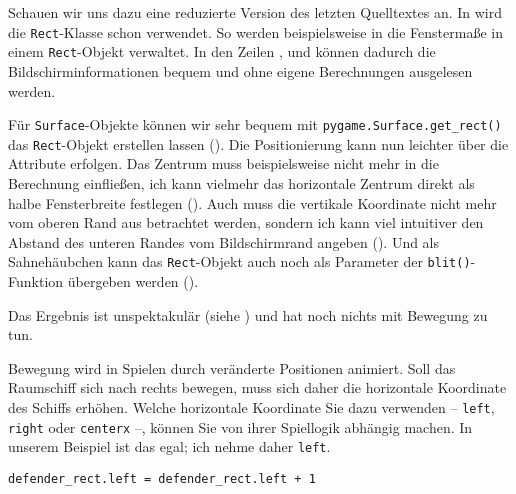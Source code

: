 Schauen wir uns dazu eine reduzierte Version des letzten Quelltextes an. In  wird die \texttt{Rect}-Klasse schon verwendet. So werden beispielsweise in  die Fenstermaße in einem \texttt{Rect}-Objekt verwaltet. In den Zeilen ,  und  können dadurch die Bildschirminformationen bequem und ohne eigene Berechnungen ausgelesen werden.


Für \texttt{Surface}-Objekte können wir sehr bequem mit \texttt{pygame.Surface.get\_rect()} das \texttt{Rect}-Objekt erstellen lassen (). Die Positionierung kann nun leichter über die Attribute erfolgen. Das Zentrum muss beispielsweise nicht mehr in die Berechnung einfließen, ich kann vielmehr das horizontale Zentrum direkt als halbe Fensterbreite festlegen (). Auch muss die vertikale Koordinate nicht mehr vom oberen Rand aus betrachtet werden, sondern ich kann viel intuitiver den Abstand des unteren Randes vom Bildschirmrand angeben (). Und als Sahnehäubchen kann das \texttt{Rect}-Objekt auch noch als Parameter der \texttt{blit()}-Funktion übergeben werden ().


Das Ergebnis ist unspektakulär (siehe ) und hat noch nichts mit Bewegung zu tun.

Bewegung wird in Spielen durch veränderte Positionen animiert. Soll das Raumschiff sich nach rechts bewegen, muss sich daher die horizontale Koordinate des Schiffs erhöhen. Welche horizontale Koordinate Sie dazu verwenden -- \texttt{left}, \texttt{right} oder \texttt{centerx} --, können Sie von ihrer Spiellogik abhängig machen. In unserem Beispiel ist das egal; ich nehme daher \texttt{left}.

\lstset{firstnumber=38}
\begin{lstlisting}
defender_rect.left = defender_rect.left + 1
\end{lstlisting}

